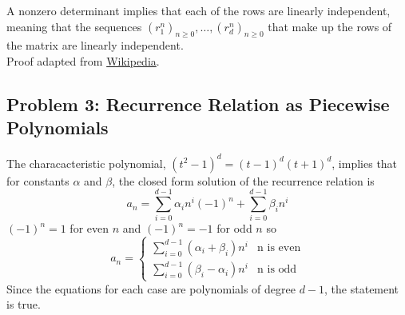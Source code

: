 \documentclass{report}
\begin{document}
A nonzero determinant implies that each of the rows are linearly independent,
meaning that the sequences $(r_1^n)_{n \geq 0}, \hdots, (r_d^n)_{n \geq 0}$ 
that make up the rows of the matrix are linearly independent. \\
    
Proof adapted from \href{https://en.wikipedia.org/wiki/Vandermonde_matrix#By_row_and_column_operations}{Wikipedia}.

\newpage

\subsection*{Problem 3: Recurrence Relation as Piecewise Polynomials}
The characacteristic polynomial, $(t^2-1)^d = (t-1)^d(t+1)^d$, 
implies that for constants $\alpha$ and $\beta$, 
the closed form solution of the recurrence relation is 
\[
    a_n = \sum_{i = 0}^{d-1} \alpha_i n^{i} (-1)^n 
        + \sum_{i = 0}^{d-1} \beta_i n^{i}
\]
$(-1)^n = 1$ for even $n$ and $(-1)^n = -1$ for odd $n$ so 
\[
    a_n = 
    \begin{cases} 
        \sum_{i = 0}^{d-1} (\alpha_i + \beta_i) n^{i} & \text{n is even} \\
        \sum_{i = 0}^{d-1} (\beta_i - \alpha_i) n^{i} & \text{n is odd}
     \end{cases}
\]
Since the equations for each case are polynomials of degree $d-1$, 
the statement is true.
\newpage
\end{document}

